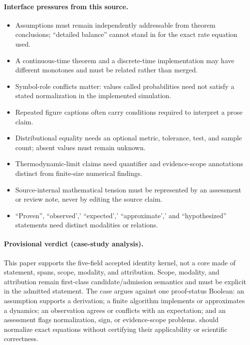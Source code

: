 \paragraph{Interface pressures from this source.}
\begin{itemize}
\item Assumptions must remain independently addressable from theorem conclusions; ``detailed balance'' cannot stand in for the exact rate equation used.
\item A continuous-time theorem and a discrete-time implementation may have different monotones and must be related rather than merged.
\item Symbol-role conflicts matter: values called probabilities need not satisfy a stated normalization in the implemented simulation.
\item Repeated figure captions often carry conditions required to interpret a prose claim.
\item Distributional equality needs an optional metric, tolerance, test, and sample count; absent values must remain unknown.
\item Thermodynamic-limit claims need quantifier and evidence-scope annotations distinct from finite-size numerical findings.
\item Source-internal mathematical tension must be represented by an assessment or review note, never by editing the source claim.
\item ``Proven'', ``observed',' ``expected',' ``approximate',' and ``hypothesized'' statements need distinct modalities or relations.
\end{itemize}

\paragraph{Provisional verdict (case-study analysis).}
This paper supports the five-field accepted identity kernel, not a core made of statement, spans, scope, modality, and attribution. Scope, modality, and attribution remain first-class candidate/admission semantics and must be explicit in the admitted statement. The case argues against one proof-status Boolean: an assumption supports a derivation; a finite algorithm implements or approximates a dynamics; an observation agrees or conflicts with an expectation; and an assessment flags normalization, sign, or evidence-scope problems. \MathClaimIR{} should normalize exact equations without certifying their applicability or scientific correctness.